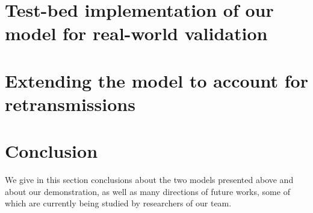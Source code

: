 



\section{Test-bed implementation of our model for real-world validation}
\label{sec:4:gnuradio}






\section{Extending the model to account for retransmissions}
\label{sec:4:retransmissions}





\section{Conclusion}
\label{sec:4:conclusion}

We give in this section conclusions about the two models presented above and about our demonstration, as well as many directions of future works, some of which are currently being studied by researchers of our team.

